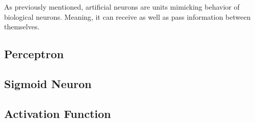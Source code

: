 As previously mentioned, artificial neurons are units mimicking behavior of biological neurons. Meaning, it can receive as well as pass information between themselves.

\subsection{Perceptron}

\subsection{Sigmoid Neuron}

\subsection{Activation Function}

